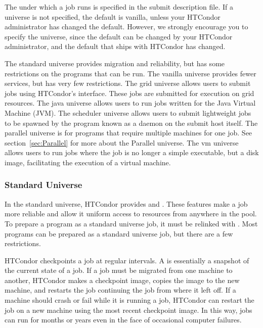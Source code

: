 The  under which a job runs
is specified in the submit description file.
If a universe is not specified,
the default is vanilla,
unless your HTCondor administrator has changed the default.
However, we strongly encourage you to specify the universe,
since the default can be changed by your HTCondor administrator,
and the default that ships with HTCondor has changed.

The standard universe provides migration and reliability, but has some
restrictions on the programs that can be run. 
The vanilla universe provides fewer services, but has very few
restrictions.
The grid universe allows users to submit 
jobs using HTCondor's interface.
These jobs are submitted for execution on grid resources.
The java universe allows users to run jobs written for the
Java Virtual Machine (JVM).
The scheduler universe allows users to submit lightweight jobs
to be spawned by the program known as a daemon on the submit host itself.
The parallel universe is for programs that require multiple machines
for one job.
See section~\ref{sec:Parallel} for more about the Parallel universe.
The vm universe allows users to run jobs where the job is
no longer a simple executable, but a disk image, facilitating
the execution of a virtual machine.

\subsubsection{\label{sec:standard-universe}Standard Universe}

In the standard universe, HTCondor provides  and
.  These features make a job more reliable
and allow it uniform access to resources from anywhere in the pool.
To prepare a program as a standard universe job, it must be relinked
with .  Most programs can be prepared as a standard
universe job, but there are a few restrictions.

HTCondor checkpoints a job at regular intervals.
A  is essentially a snapshot of the current
state of a job. 
If a job must be migrated from one machine to another,
HTCondor makes a checkpoint image, copies the image to the new machine,
and restarts the job continuing the job from where it left off.
If a machine should
crash or fail while it is running a job, HTCondor can restart the job on
a new machine using the most recent checkpoint image.
In this way, jobs
can run for months or years even in the face of occasional computer failures.

